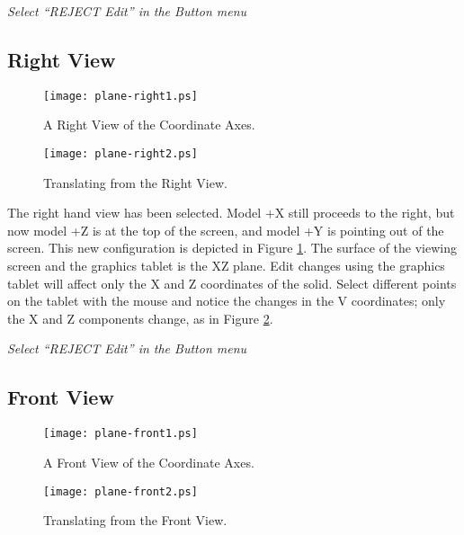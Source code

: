 {\em Select ``REJECT Edit'' in the Button menu}

\subsection{Right View}
\begin{figure}
\centering \texttt{[image: plane-right1.ps]}
\caption{A Right View of the Coordinate Axes.}
\label{plane-right1}
\end{figure}
\begin{figure}
\centering \texttt{[image: plane-right2.ps]}
\caption{Translating from the Right View.}
\label{plane-right2}
\end{figure}


The right hand view has been selected. Model +X still proceeds to the right,
but now model +Z is at the top of the screen, and model +Y is
pointing out of the screen.
This new configuration is depicted in Figure \ref{plane-right1}.
The surface of the viewing screen and the graphics tablet is the XZ plane.
Edit changes using the graphics tablet will affect only the X and Z
coordinates of the solid.
Select different points on the tablet with the mouse and notice the
changes in the V coordinates;  only the X and Z components change,
as in Figure \ref{plane-right2}.

{\em Select ``REJECT Edit'' in the Button menu}

\subsection{Front View}
\begin{figure}
\centering \texttt{[image: plane-front1.ps]}
\caption{A Front View of the Coordinate Axes.}
\label{plane-front1}
\end{figure}
\begin{figure}
\centering \texttt{[image: plane-front2.ps]}
\caption{Translating from the Front View.}
\label{plane-front2}
\end{figure}


